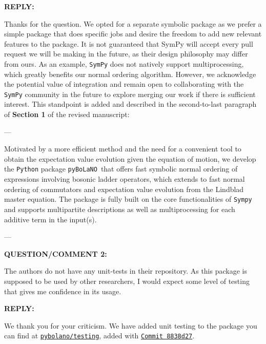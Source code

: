 \documentclass[12pt, a4paper]{article}
\newcommand{\pybolano}{\texttt{pyBoLaNO}~}
\newenvironment{revision}{%
\color{red}
}
{}
\newenvironment{revq}[1]{%
\newpage\phantomsection
\color{RoyalPurple}
\par
\textbf{QUESTION/COMMENT {#1}:}
\par
}
{\bigskip}
\newenvironment{reva}{%
\color{Black}
\par
\textbf{REPLY:}
\par
}
{\bigskip}
\begin{document}
\begin{reva}
Thanks for the question. We opted for a separate symbolic package as we prefer a simple package that does specific jobs and desire the freedom to add new relevant features to the package. It is not guaranteed that SymPy will accept every pull request we will be making in the future, as their design philosophy may differ from ours. As an example, \texttt{SymPy} does not natively support multiprocessing, which greatly benefits our normal ordering algorithm. However, we acknowledge the potential value of integration and remain open to collaborating with the \texttt{SymPy} community in the future to explore merging our work if there is sufficient interest. This standpoint is added and described in the second-to-last paragraph of \textbf{Section 1} of the revised manuscript:

---

\begin{revision}Motivated by a more efficient method and the need for a convenient tool to obtain the expectation value evolution given the equation of motion, we develop the \texttt{Python} package \pybolano that offers fast symbolic normal ordering of expressions involving bosonic ladder operators, which extends to fast normal ordering of commutators and expectation value evolution from the Lindblad master equation. The package is fully built on the core functionalities of \texttt{Sympy} and supports multipartite descriptions as well as multiprocessing for each additive term in the input(s).\end{revision}

---

\end{reva}


\begin{revq}{2}
The authors do not have any unit-tests in their repository. As this package is supposed to be used by other researchers, I would expect some level of testing that gives me confidence in its usage. 
\end{revq}

\begin{reva}
We thank you for your criticism. We have added unit testing to the package you can find at \href{https://github.com/hendry24/pyBoLaNO/tree/main/pybolano/testing}{\texttt{pybolano/testing}}, added with \href{https://github.com/hendry24/pyBoLaNO/commit/8838d27293e6475f92c1827ddb7ad3e6f3e8471a}{\texttt{Commit 8838d27}}.
\end{reva}
\end{document}
